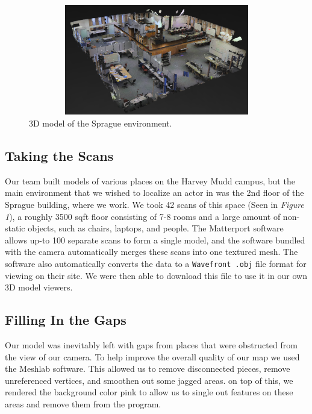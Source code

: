 \documentclass[a4paper,11pt]{article}
\begin{document}
   \begin{figure}[h!]
   \centering
     \includegraphics[height=1.9in,width=4.9in,angle=0]{../Artifacts/rp1}
   \caption{3D model of the Sprague environment.}
  \end{figure}
  
  \subsection{Taking the Scans}
 Our team built models of various places on the Harvey Mudd campus, but the main environment that we wished to localize an actor in was the 2nd floor of the Sprague building, where we work. We took 42 scans of this space (Seen in \emph{Figure 1}), a roughly 3500 sqft floor consisting of 7-8 rooms and a large amount of non-static objects, such as chairs, laptops, and people. The Matterport software allows up-to 100 separate scans to form a single model, and the software bundled with the camera automatically merges these scans into one textured mesh. The software also automatically converts the data to a \texttt{Wavefront .obj} file format for viewing on their site. We were then able to download this file to use it in our own 3D model viewers. 

  \subsection{Filling In the Gaps}
  Our model was inevitably left with gaps from places that were obstructed from the view of our camera. To help improve the overall quality of our map we used the Meshlab software. This allowed us to remove disconnected pieces, remove unreferenced vertices, and smoothen out some jagged areas. on top of this, we rendered the background color pink to allow us to single out features on these areas and remove them from the program. 
  
  \newpage
\end{document}
